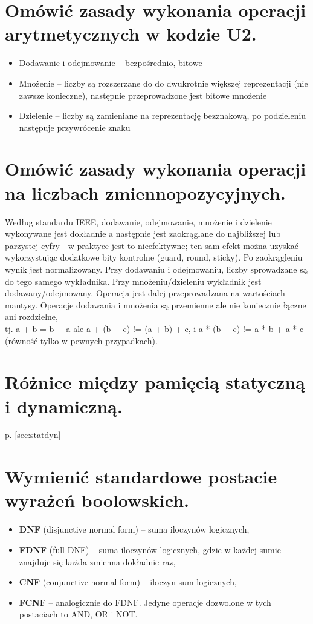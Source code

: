 \documentclass[12pt,a4paper]{article}
\begin{document}
	\section{Omówić zasady wykonania operacji arytmetycznych w kodzie U2.}
	\begin{itemize}
		\item Dodawanie i odejmowanie -- bezpośrednio, bitowe
		\item Mnożenie -- liczby są rozszerzane do do dwukrotnie większej reprezentacji (nie zawsze konieczne), następnie przeprowadzone jest bitowe mnożenie
		\item Dzielenie -- liczby są zamieniane na reprezentację bezznakową, po podzieleniu następuje przywrócenie znaku
\end{itemize}		

	\section{Omówić zasady wykonania operacji na liczbach zmiennopozycyjnych.}
	Według standardu IEEE, dodawanie, odejmowanie, mnożenie i dzielenie wykonywane jest dokładnie a następnie jest zaokrąglane do najbliższej lub parzystej cyfry - w praktyce jest to nieefektywne; ten sam efekt można uzyskać wykorzystując dodatkowe bity kontrolne (guard, round, sticky). Po zaokrągleniu wynik jest normalizowany. Przy dodawaniu i odejmowaniu, liczby sprowadzane są do tego samego wykładnika. Przy mnożeniu/dzieleniu wykładnik jest dodawany/odejmowany. Operacja jest dalej przeprowadzana na wartościach mantysy. Operacje dodawania i mnożenia są przemienne ale nie koniecznie łączne ani rozdzielne,\\tj. a + b = b + a ale a + (b + c) != (a + b) + c, i a * (b + c) != a * b + a * c (równość tylko w pewnych przypadkach).

	\section{Różnice między pamięcią statyczną i dynamiczną.}
	p. \ref{sec:statdyn}

	\section{Wymienić standardowe postacie wyrażeń boolowskich.}
	\begin{itemize}
		\item \textbf{DNF} (disjunctive normal form) -- suma iloczynów logicznych,
		\item \textbf{FDNF} (full DNF) -- suma iloczynów logicznych, gdzie w każdej sumie znajduje się każda zmienna dokładnie raz,
		\item \textbf{CNF} (conjunctive normal form) -- iloczyn sum logicznych,
		\item \textbf{FCNF} -- analogicznie do FDNF. Jedyne operacje dozwolone w tych postaciach to AND, OR i NOT.
	\end{itemize}
\end{document}
